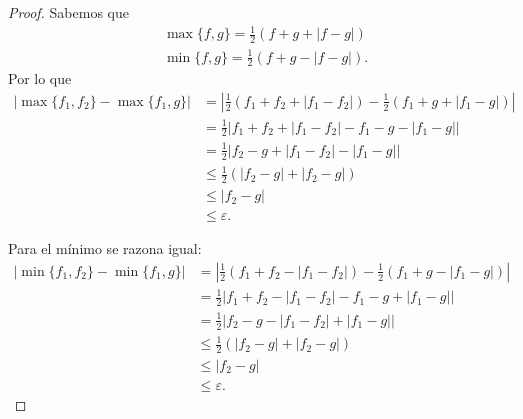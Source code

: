 \begin{proof}
    Sabemos que 
    \begin{align}
        & \max\{f,g\} = \frac{1}{2} (f+g+ |f-g|) \\
        & \min \{f,g\} = \frac{1}{2} (f+g -|f-g|).
    \end{align}
    Por lo que 
    \begin{align}
        |
            \max\{f_1, f_2\}
            -
            \max\{f_1, g\}
        |   
        & = 
        \left|
            \frac{1}{2} (f_1+f_2+ |f_1-f_2|)
            -
            \frac{1}{2} (f_1+g+ |f_1-g|)
        \right|
        \\
        &= 
        \frac{1}{2}
        \big|
             f_1+f_2+ |f_1-f_2|
            -
            f_1 - g - |f_1-g|
        \big|
        \\
        &= 
        \frac{1}{2}
        \big|
             f_2 - g + |f_1-f_2|
           - |f_1-g|
           \big|
        \\
        & \leq
        \frac{1}{2}
        (|f_2 - g |
         +
         |f_2 - g |
        )
        \\
        & \leq
        |f_2 - g |
        \\
        & \leq
        \varepsilon.
    \end{align} 

    Para el mínimo se razona igual: 
    \begin{align}
        |
            \min\{f_1, f_2\}
            -
            \min\{f_1, g\}
        |   
        & = 
        \left|
            \frac{1}{2} (f_1+f_2- |f_1-f_2|)
            -
            \frac{1}{2} (f_1+g - |f_1-g|)
        \right|
        \\
        &= 
        \frac{1}{2}
        \big|
             f_1+f_2- |f_1-f_2|
            -
            f_1 - g + |f_1-g|
        \big|
        \\
        &= 
        \frac{1}{2}
        \big|
             f_2 - g - |f_1-f_2|
           + |f_1-g|
        \big|
        \\
        & \leq
        \frac{1}{2}
        (
        |f_2 - g |
         +
         |f_2 - g |
        )
        \\
        & \leq
        |f_2 - g|
        \\
        & \leq
        \varepsilon.
    \end{align} 
    
\end{proof}

